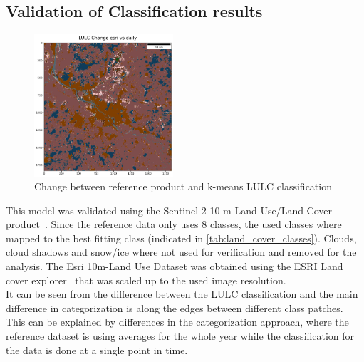 \documentclass[12pt,a4paper, english,twoside]{scrartcl}
\begin{document}
    \subsection{Validation of Classification results}\label{sec:references}
      \begin{figure}
         \begin{center}
         \includegraphics[width=0.46\textwidth]{img/DiffLULC}
       \end{center}
       \caption{Change between reference product and k-means \gls{LULC} classification}\label{fig:lulcDiff}
      \end{figure}
      This model was validated using the Sentinel-2 10 m Land Use/Land Cover product~\autocite{Sentiel10mLULC}. 
      Since the reference data only uses 8 classes, the used classes where mapped to the best fitting class (indicated in \cref{tab:land_cover_classes}). 
      Clouds, cloud shadows and snow/ice where not used for verification and removed for the analysis.
      The Esri 10m-Land Use Dataset was obtained using the ESRI Land cover explorer~\autocite{Zhang} that was scaled up to the used image resolution. \\
      It can be seen from the difference between the \gls{LULC} classification and the main difference in categorization is along the edges between different class patches. 
      This can be explained by differences in the categorization approach, where the reference dataset is using averages for the whole year while the classification for the data is done at a single point in time. 
\end{document}
